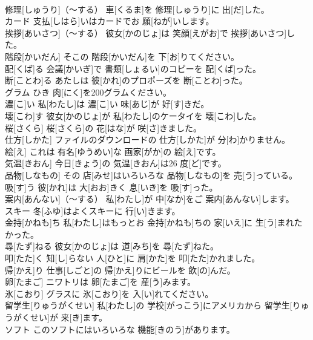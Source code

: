 \documentclass[8pt]{extreport}
\begin{document}
\begin{CJK}{UTF8}{min}
\\	修理[しゅうり]（～する）	車[くるま]を 修理[しゅうり]に 出[だ]した。		
\\	カード	支払[しはら]いはカードでお 願[ねが]いします。		
\\	挨拶[あいさつ]（～する）	彼女[かのじょ]は 笑顔[えがお]で 挨拶[あいさつ]した。		
\\	階段[かいだん]	そこの 階段[かいだん]を 下[お]りてください。		
\\	配[くば]る	会議[かいぎ]で 書類[しょるい]のコピーを 配[くば]った。		
\\	断[ことわ]る	あたしは 彼[かれ]のプロポーズを 断[ことわ]った。		
\\	グラム	ひき 肉[にく]を200グラムください。		
\\	濃[こ]い	私[わたし]は 濃[こ]い 味[あじ]が 好[す]きだ。		
\\	壊[こわ]す	彼女[かのじょ]が 私[わたし]のケータイを 壊[こわ]した。		
\\	桜[さくら]	桜[さくら]の 花[はな]が 咲[さ]きました。		
\\	仕方[しかた]	ファイルのダウンロードの 仕方[しかた]が 分[わ]かりません。		
\\	絵[え]	これは 有名[ゆうめい]な 画家[がか]の 絵[え]です。		
\\	気温[きおん]	今日[きょう]の 気温[きおん]は26 度[ど]です。		
\\	品物[しなもの]	その 店[みせ]はいろいろな 品物[しなもの]を 売[う]っている。		
\\	吸[す]う	彼[かれ]は 大[おお]きく 息[いき]を 吸[す]った。		
\\	案内[あんない]（～する）	私[わたし]が 中[なか]をご 案内[あんない]します。		
\\	スキー	冬[ふゆ]はよくスキーに 行[い]きます。		
\\	金持[かねも]ち	私[わたし]はもっとお 金持[かねも]ちの 家[いえ]に 生[う]まれたかった。		
\\	尋[たず]ねる	彼女[かのじょ]は 道[みち]を 尋[たず]ねた。		
\\	叩[たた]く	知[し]らない 人[ひと]に 肩[かた]を 叩[たた]かれました。		
\\	帰[かえ]り	仕事[しごと]の 帰[かえ]りにビールを 飲[の]んだ。		
\\	卵[たまご]	ニワトリは 卵[たまご]を 産[う]みます。		
\\	氷[こおり]	グラスに 氷[こおり]を 入[い]れてください。		
\\	留学生[りゅうがくせい]	私[わたし]の 学校[がっこう]にアメリカから 留学生[りゅうがくせい]が 来[き]ます。		
\\	ソフト	このソフトにはいろいろな 機能[きのう]があります。		

\end{CJK}
\end{document}
